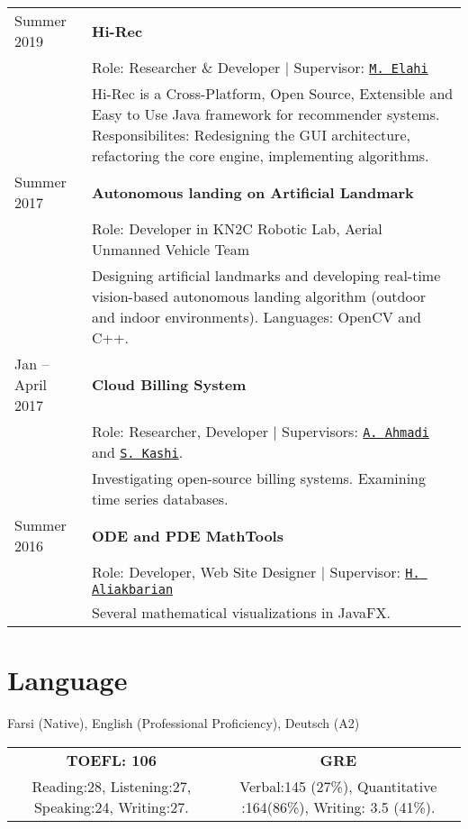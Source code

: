 \documentclass[letterpaper]{article}
\begin{document}
{{\renewcommand{\arraystretch}{1.2}
\begin{tabular}{l p{15cm}}
Summer 2019  & \textbf{Hi-Rec} \\ & Role: Researcher \& Developer | Supervisor: \href{https://scholar.google.com/citations?user=aUWF7LYAAAAJ&hl=en}{\tt M. Elahi} \\&Hi-Rec is a Cross-Platform, Open Source, Extensible and Easy to Use Java framework for recommender systems. Responsibilites: Redesigning the GUI architecture, refactoring the core engine, implementing algorithms.
\\
Summer 2017 & \textbf{Autonomous landing on Artificial Landmark} \\ & Role: Developer in KN2C Robotic Lab, Aerial Unmanned Vehicle Team \\&Designing artificial landmarks and developing real-time vision-based autonomous landing algorithm (outdoor and indoor environments). Languages: OpenCV and C++.
\\
Jan – April 2017 & \textbf{Cloud Billing System} \\& Role: Researcher, Developer | Supervisors: \href{http://wp.kntu.ac.ir/ahmadi/}{\tt A. Ahmadi} and \href{http://wp.kntu.ac.ir/sedighian/}{\tt  S. Kashi}.
\\&
Investigating open-source billing systems. Examining time series databases.
\\
Summer 2016 &  \textbf{ODE and PDE MathTools} \\&
Role: Developer, Web Site Designer | Supervisor: \href{http://wp.kntu.ac.ir/aliakbarian/}{\tt H. Aliakbarian} \\&
Several mathematical visualizations in JavaFX.

\end{tabular}

\section*{Language}

Farsi (Native), English (Professional Proficiency), Deutsch (A2)\newline



\begin{tabular}{|c|c|}
\textbf{TOEFL: 106} & \textbf{GRE} \\
Reading:28, Listening:27, Speaking:24, Writing:27. & Verbal:145 (27\%), Quantitative :164(86\%), Writing: 3.5 (41\%).\\
\end{tabular}

}}
\end{document}

